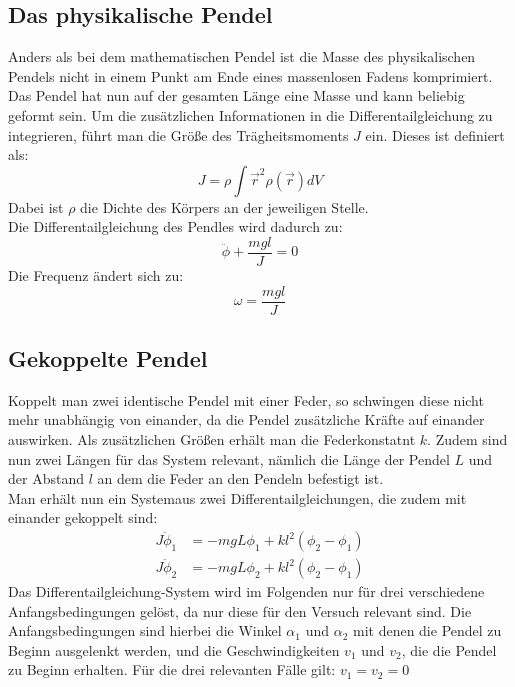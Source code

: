 \subsection{Das physikalische Pendel}
Anders als bei dem mathematischen Pendel ist die Masse des physikalischen Pendels nicht in einem Punkt am Ende eines massenlosen Fadens komprimiert.
Das Pendel hat nun auf der gesamten Länge eine Masse und kann beliebig geformt sein. Um die zusätzlichen Informationen in die Differentailgleichung
zu integrieren, führt man die Größe des Trägheitsmoments $J$ ein. Dieses ist definiert als:
\begin{equation}
    J=\rho\int{\vec{r}^2\rho(\vec{r})dV}
\end{equation}
Dabei ist $\rho$ die Dichte des Körpers an der jeweiligen Stelle.
\\
Die Differentailgleichung des Pendles wird dadurch zu:
\begin{equation}
    \ddot{\phi}+\frac{mgl}{J}=0
\end{equation}
Die Frequenz ändert sich zu:
\begin{equation}
    \omega=\frac{mgl}{J}
\end{equation}

\subsection{Gekoppelte Pendel}
Koppelt man zwei identische Pendel mit einer Feder, so schwingen diese nicht mehr unabhängig von einander, da die Pendel zusätzliche Kräfte auf 
einander auswirken. Als zusätzlichen Größen erhält man die Federkonstatnt $k$. Zudem sind nun zwei Längen für das System relevant, nämlich die 
Länge der Pendel $L$ und der Abstand $l$ an dem die Feder an den Pendeln befestigt ist. 
\\
Man erhält nun ein Systemaus zwei Differentailgleichungen, die zudem mit einander gekoppelt sind:
\begin{align}
    J\ddot{\phi}_1&=-mgL\phi_1+kl^2(\phi_2-\phi_1)\\
    J\ddot{\phi}_2&=-mgL\phi_2+kl^2(\phi_2-\phi_1)
\end{align}
Das Differentailgleichung-System wird im Folgenden nur für drei verschiedene Anfangsbedingungen gelöst, da nur diese für den Versuch relevant sind.
Die Anfangsbedingungen sind hierbei die Winkel $\alpha_1$ und $\alpha_2$ mit denen die Pendel zu Beginn ausgelenkt werden, und die Geschwindigkeiten
$v_1$ und $v_2$, die die Pendel zu Beginn erhalten. Für die drei relevanten Fälle gilt: $v_1=v_2=0$

